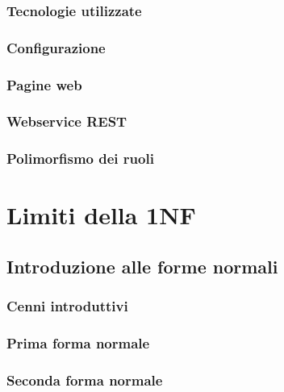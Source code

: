 \documentclass[10pt,twoside,cucitura]{toptesi}
\begin{document}
\section{Tecnologie utilizzate}


\section{Configurazione}


\section{Pagine web}
\label{sec:pagineWeb}


\section{Webservice REST}


\section{Polimorfismo dei ruoli}
\label{sec:polimorfismo}


\part{Limiti della 1NF}

\chapter{Introduzione alle forme normali}

\section{Cenni introduttivi}


\section{Prima forma normale}


\section{Seconda forma normale}

\end{document}
